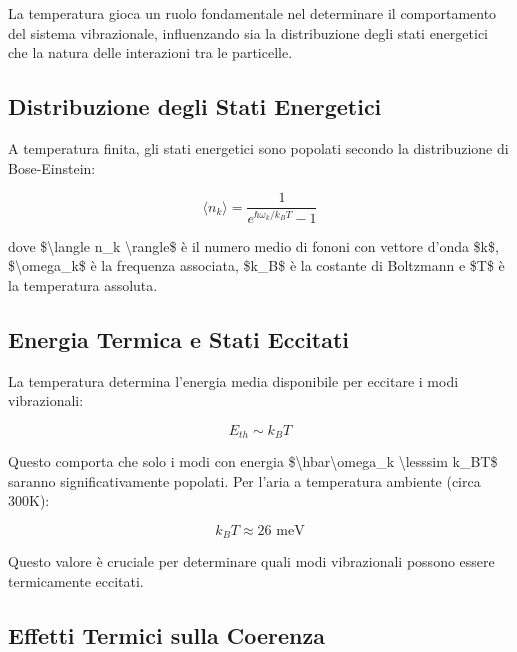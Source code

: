 \documentclass[a4paper,11pt]{article}
\begin{document}
La temperatura gioca un ruolo fondamentale nel determinare il
comportamento del sistema vibrazionale, influenzando sia la
distribuzione degli stati energetici che la natura delle interazioni tra
le particelle.

\subsection{Distribuzione degli Stati Energetici}\hypertarget{distribuzione-degli-stati-energetici}{}\label{distribuzione-degli-stati-energetici}

A temperatura finita, gli stati energetici sono popolati secondo la
distribuzione di Bose-Einstein:

\begin{displaymath}
\langle n_k \rangle = \frac{1}{e^{\hbar\omega_k/k_BT} - 1}
\end{displaymath}

dove \$\textbackslash{}langle n\_k \textbackslash{}rangle\$ è il numero medio di fononi con vettore
d'onda \$k\$, \$\textbackslash{}omega\_k\$ è la frequenza associata, \$k\_B\$ è la costante di
Boltzmann e \$T\$ è la temperatura assoluta.

\subsection{Energia Termica e Stati Eccitati}\hypertarget{energia-termica-e-stati-eccitati}{}\label{energia-termica-e-stati-eccitati}

La temperatura determina l'energia media disponibile per eccitare i modi
vibrazionali:

\begin{displaymath}
E_{th} \sim k_BT
\end{displaymath}

Questo comporta che solo i modi con energia
\$\textbackslash{}hbar\textbackslash{}omega\_k \textbackslash{}lesssim k\_BT\$ saranno significativamente popolati. Per
l'aria a temperatura ambiente (circa 300K):

\begin{displaymath}
k_BT \approx 26 \text{ meV}
\end{displaymath}

Questo valore è cruciale per determinare quali modi vibrazionali possono
essere termicamente eccitati.

\subsection{Effetti Termici sulla Coerenza}\hypertarget{effetti-termici-sulla-coerenza}{}\label{effetti-termici-sulla-coerenza}
\end{document}

